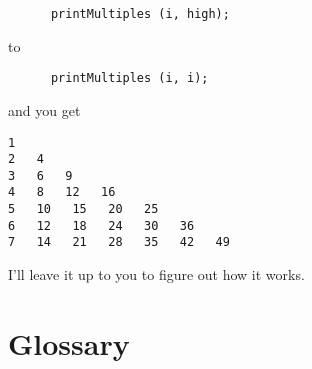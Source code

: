 \begin{verbatim}
      printMultiples (i, high);
\end{verbatim}
%
to

\begin{verbatim}
      printMultiples (i, i);
\end{verbatim}
%
and you get

\begin{verbatim}
1   
2   4   
3   6   9   
4   8   12   16   
5   10   15   20   25   
6   12   18   24   30   36   
7   14   21   28   35   42   49  
\end{verbatim}
%
I'll leave it up to you to figure out how it works.

\section{Glossary}

